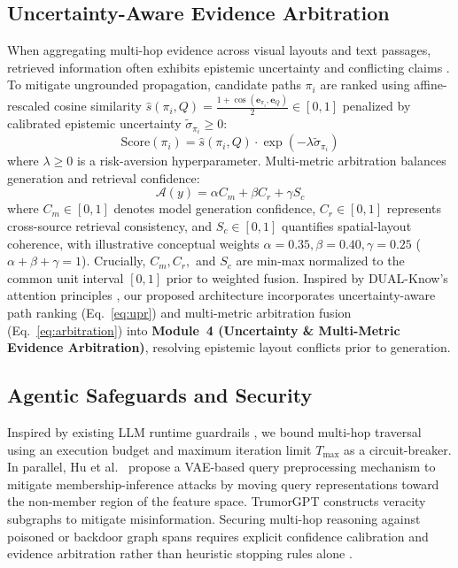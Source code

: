 \documentclass[conference,a4paper]{IEEEtran}
\begin{document}
\subsection{Uncertainty-Aware Evidence Arbitration}
When aggregating multi-hop evidence across visual layouts and text passages, retrieved information often exhibits epistemic uncertainty and conflicting claims \cite{gawlikowski2023}. To mitigate ungrounded propagation, candidate paths $\pi_i$ are ranked using affine-rescaled cosine similarity $\hat{s}(\pi_i, Q) = \frac{1 + \cos(\mathbf{e}_{\pi_i}, \mathbf{e}_Q)}{2} \in [0,1]$ penalized by calibrated epistemic uncertainty $\tilde{\sigma}_{\pi_i} \ge 0$:
\begin{equation}
\text{Score}(\pi_i) = \hat{s}(\pi_i, Q) \cdot \exp(-\lambda \tilde{\sigma}_{\pi_i})
\label{eq:upr}
\end{equation}
where $\lambda \ge 0$ is a risk-aversion hyperparameter. Multi-metric arbitration balances generation and retrieval confidence:
\begin{equation}
\mathcal{A}(y) = \alpha C_m + \beta C_r + \gamma S_c
\label{eq:arbitration}
\end{equation}
where $C_m \in [0,1]$ denotes model generation confidence, $C_r \in [0,1]$ represents cross-source retrieval consistency, and $S_c \in [0,1]$ quantifies spatial-layout coherence, with illustrative conceptual weights $\alpha=0.35, \beta=0.40, \gamma=0.25$ ($\alpha+\beta+\gamma=1$). Crucially, $C_m, C_r,$ and $S_c$ are min-max normalized to the common unit interval $[0,1]$ prior to weighted fusion. Inspired by DUAL-Know's attention principles \cite{qi2026}, our proposed architecture incorporates uncertainty-aware path ranking (Eq.~\ref{eq:upr}) and multi-metric arbitration fusion (Eq.~\ref{eq:arbitration}) into \textbf{Module~4 (Uncertainty \& Multi-Metric Evidence Arbitration)}, resolving epistemic layout conflicts prior to generation.

\subsection{Agentic Safeguards and Security}
Inspired by existing LLM runtime guardrails \cite{tripathi2026, yang2025adaptiveguard}, we bound multi-hop traversal using an execution budget and maximum iteration limit $T_{\max}$ as a circuit-breaker. In parallel, Hu et al.~\cite{hu2025membership} propose a VAE-based query preprocessing mechanism to mitigate membership-inference attacks by moving query representations toward the non-member region of the feature space. TrumorGPT \cite{hang2025trumor} constructs veracity subgraphs to mitigate misinformation. Securing multi-hop reasoning against poisoned or backdoor graph spans \cite{zheng2026trigger} requires explicit confidence calibration and evidence arbitration rather than heuristic stopping rules alone \cite{qi2026}.
\end{document}
